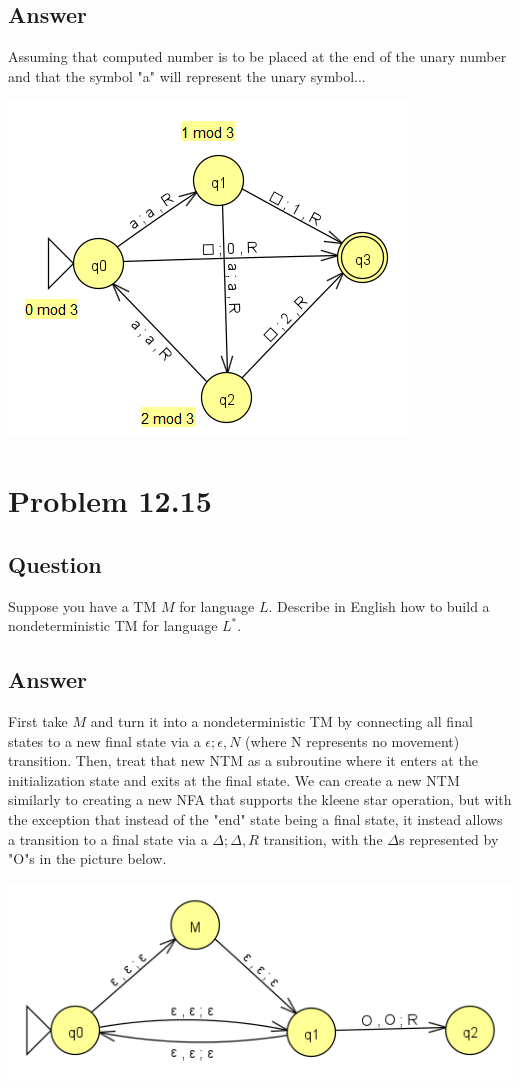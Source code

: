 \documentclass[12pt, a4paper]{article}
\begin{document}
\subsection{Answer}
Assuming that computed number is to be placed at the end of the unary number and that the symbol "a" will represent the unary symbol...
\begin{center}
\includegraphics[scale=1]{12.3c}
\end{center}

\section{Problem 12.15}
\subsection{Question}
Suppose you have a TM $M$ for language $L$. Describe in English how to build a nondeterministic TM for language $L^{*}$.
\subsection{Answer}
First take $M$ and turn it into a nondeterministic TM by connecting all final states to a new final state via a $\epsilon; \epsilon, N$ (where N represents no movement) transition. Then, treat that new NTM as a subroutine where it enters at the initialization state and exits at the final state. We can create a new NTM similarly to creating a new NFA that supports the kleene star operation, but with the exception that instead of the "end" state being a final state, it instead allows a transition to a final state via a $\Delta; \Delta, R$ transition, with the $\Delta$s represented by "O"s in the picture below.
\begin{center}
\includegraphics[scale=1]{12.15}
\end{center}
\end{document}
